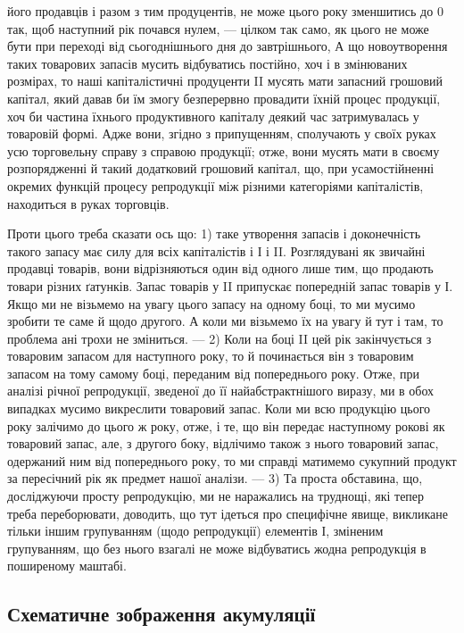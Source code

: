 \parcont{}  %
його продавців і разом з тим продуцентів, не може цього року зменшитись
до 0 так, щоб наступний рік почався нулем, — цілком так само, як
цього не може бути при переході від сьогоднішнього дня до завтрішнього,
А що новоутворення таких товарових запасів мусить відбуватись постійно,
хоч і в змінюваних розмірах, то наші капіталістичні продуценти II мусять
мати запасний грошовий капітал, який давав би їм змогу безперервно
провадити їхній процес продукції, хоч би частина їхнього продуктивного
капіталу деякий час затримувалась у товаровій формі. Адже вони, згідно
з припущенням, сполучають у своїх руках усю торговельну справу
з справою продукції; отже, вони мусять мати в своєму розпорядженні
й такий додатковий грошовий капітал, що, при усамостійненні окремих
функцій процесу репродукції між різними категоріями капіталістів, находиться
в руках торговців.

Проти цього треба сказати ось що: 1) таке утворення запасів і доконечність
такого запасу має силу для всіх капіталістів і І і II. Розглядувані
як звичайні продавці товарів, вони відрізняються один від одного
лише тим, що продають товари різних ґатунків. Запас товарів у II припускає
попередній запас товарів у І. Якщо ми не візьмемо на увагу
цього запасу на одному боці, то ми мусимо зробити те саме й щодо
другого. А коли ми візьмемо їх на увагу й тут і там, то проблема ані
трохи не зміниться. — 2) Коли на боці II цей рік закінчується з товаровим
запасом для наступного року, то й починається він з товаровим запасом
на тому самому боці, переданим від попереднього року.
Отже, при аналізі річної репродукції, зведеної до її найабстрактнішого виразу,
ми в обох випадках мусимо викреслити товаровий запас. Коли ми всю
продукцію цього року залічимо до цього ж року, отже, і те, що він передає
наступному рокові як товаровий запас, але, з другого боку, відлічимо
також з нього товаровий запас, одержаний ним від попереднього року,
то ми справді матимемо сукупний продукт за пересічний рік як предмет
нашої аналізи. — 3) Та проста обставина, що, досліджуючи просту
репродукцію, ми не наражались на труднощі, які тепер треба переборювати,
доводить, що тут ідеться про специфічне явище, викликане тільки
іншим групуванням (щодо репродукції) елементів І, зміненим групуванням,
що без нього взагалі не може відбуватись жодна репродукція в поширеному
маштабі.

\subsection{Схематичне зображення акумуляції}

